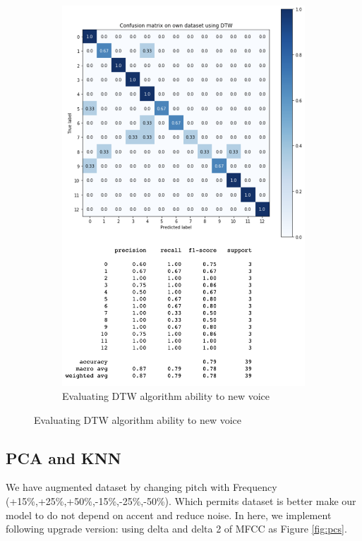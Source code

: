 \documentclass[%
  article,%
  10pt,%
  a4paper,%
  fleqn,%
  oneside,%
  sumario = tradicional,%
  chapter = TITLE,%
  section = TITLE,%
]{abntex2}
\begin{document}
\begin{figure}
\begin{minipage}[b]{.4\textwidth}
\begin{figure}[H]
  \includegraphics[width = \columnwidth]{./Figuras/dtwnewvoice}
   \caption{Evaluating DTW algorithm ability to new voice}
   \label{fig:dtwnewvoice}
\end{figure}
\end{minipage}
\end{figure}
\subsection{PCA and KNN}
We have augmented dataset by changing pitch with Frequency (+15\%,+25\%,+50\%,-15\%,-25\%,-50\%). Which permits dataset is better make our model to do not depend on accent and reduce noise. In here, we implement following upgrade version: using delta and delta 2 of MFCC as Figure \ref{fig:pcs}.
\end{document}
